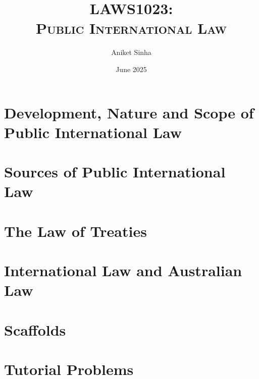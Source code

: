 \documentclass[oneside, 12pt]{book}
\title{\Huge\bfseries\scshape LAWS1023: \\ Public International Law}
\author{Aniket Sinha}
\date{June 2025}
\begin{document}
\maketitle

\frontmatter

\tableofcontents



\flushleft

\mainmatter

\chapter{Development, Nature and Scope of Public International Law}


\chapter{Sources of Public International Law}


\chapter{The Law of Treaties}


\chapter{International Law and Australian Law}


\appendix
\chapter{Scaffolds}


\chapter{Tutorial Problems}


\glsaddall
\printglossary[type=main, nonumberlist, title={Glossary}]
\end{document}
